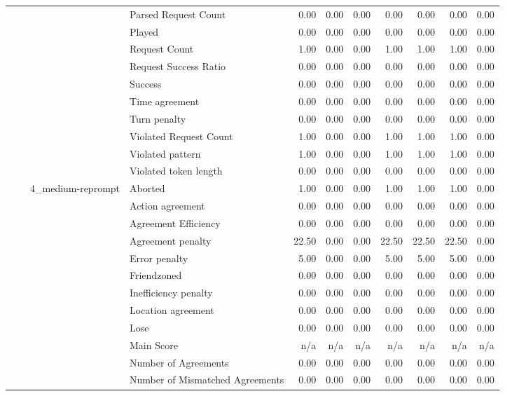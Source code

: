 \begin{tabular}{llllrrrrrrr}
 &  &  & Parsed Request Count & 0.00 & 0.00 & 0.00 & 0.00 & 0.00 & 0.00 & 0.00 \\
 &  &  & Played & 0.00 & 0.00 & 0.00 & 0.00 & 0.00 & 0.00 & 0.00 \\
 &  &  & Request Count & 1.00 & 0.00 & 0.00 & 1.00 & 1.00 & 1.00 & 0.00 \\
 &  &  & Request Success Ratio & 0.00 & 0.00 & 0.00 & 0.00 & 0.00 & 0.00 & 0.00 \\
 &  &  & Success & 0.00 & 0.00 & 0.00 & 0.00 & 0.00 & 0.00 & 0.00 \\
 &  &  & Time agreement & 0.00 & 0.00 & 0.00 & 0.00 & 0.00 & 0.00 & 0.00 \\
 &  &  & Turn penalty & 0.00 & 0.00 & 0.00 & 0.00 & 0.00 & 0.00 & 0.00 \\
 &  &  & Violated Request Count & 1.00 & 0.00 & 0.00 & 1.00 & 1.00 & 1.00 & 0.00 \\
 &  &  & Violated pattern & 1.00 & 0.00 & 0.00 & 1.00 & 1.00 & 1.00 & 0.00 \\
 &  &  & Violated token length & 0.00 & 0.00 & 0.00 & 0.00 & 0.00 & 0.00 & 0.00 \\
\cline{3-11}
 &  & \multirow[t]{27}{*}{4_medium-reprompt} & Aborted & 1.00 & 0.00 & 0.00 & 1.00 & 1.00 & 1.00 & 0.00 \\
 &  &  & Action agreement & 0.00 & 0.00 & 0.00 & 0.00 & 0.00 & 0.00 & 0.00 \\
 &  &  & Agreement Efficiency & 0.00 & 0.00 & 0.00 & 0.00 & 0.00 & 0.00 & 0.00 \\
 &  &  & Agreement penalty & 22.50 & 0.00 & 0.00 & 22.50 & 22.50 & 22.50 & 0.00 \\
 &  &  & Error penalty & 5.00 & 0.00 & 0.00 & 5.00 & 5.00 & 5.00 & 0.00 \\
 &  &  & Friendzoned & 0.00 & 0.00 & 0.00 & 0.00 & 0.00 & 0.00 & 0.00 \\
 &  &  & Inefficiency penalty & 0.00 & 0.00 & 0.00 & 0.00 & 0.00 & 0.00 & 0.00 \\
 &  &  & Location agreement & 0.00 & 0.00 & 0.00 & 0.00 & 0.00 & 0.00 & 0.00 \\
 &  &  & Lose & 0.00 & 0.00 & 0.00 & 0.00 & 0.00 & 0.00 & 0.00 \\
 &  &  & Main Score & n/a & n/a & n/a & n/a & n/a & n/a & n/a \\
 &  &  & Number of Agreements & 0.00 & 0.00 & 0.00 & 0.00 & 0.00 & 0.00 & 0.00 \\
 &  &  & Number of Mismatched Agreements & 0.00 & 0.00 & 0.00 & 0.00 & 0.00 & 0.00 & 0.00 \\

\end{tabular}
